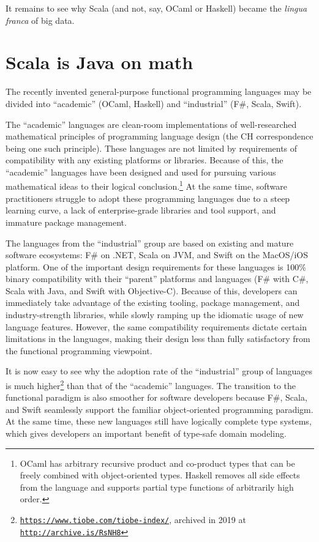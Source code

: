 It remains to see why Scala (and not, say, OCaml or Haskell) became
the \emph{lingua franca} of big data.

\section{Scala is Java on math }

The recently invented general-purpose functional programming languages
may be divided into \textsf{``}academic\textsf{''} (OCaml, Haskell) and \textsf{``}industrial\textsf{''}
(F\#, Scala, Swift).

The \textsf{``}academic\textsf{''} languages are clean-room implementations of well-researched
mathematical principles of programming language design (the CH correspondence
being one such principle). These languages are not limited by requirements
of compatibility with any existing platforms or libraries. Because
of this, the \textsf{``}academic\textsf{''} languages have been designed and used
for pursuing various mathematical ideas to their logical conclusion.\footnote{OCaml has arbitrary recursive product and co-product types that can
be freely combined with object-oriented types. Haskell removes all
side effects from the language and supports partial type functions
of arbitrarily high order.} At the same time, software practitioners struggle to adopt these
programming languages due to a steep learning curve, a lack of enterprise-grade
libraries and tool support, and immature package management.

The languages from the \textsf{``}industrial\textsf{''} group are based on existing
and mature software ecosystems: F\# on .NET, Scala on JVM, and Swift
on the MacOS/iOS platform. One of the important design requirements
for these languages is 100\% binary compatibility with their \textsf{``}parent\textsf{''}
platforms and languages (F\# with C\#, Scala with Java, and Swift
with Objective-C). Because of this, developers can immediately take
advantage of the existing tooling, package management, and industry-strength
libraries, while slowly ramping up the idiomatic usage of new language
features. However, the same compatibility requirements dictate certain
limitations in the languages, making their design less than fully
satisfactory from the functional programming viewpoint.

It is now easy to see why the adoption rate of the \textsf{``}industrial\textsf{''}
group of languages is much higher\footnote{\texttt{\href{https://www.tiobe.com/tiobe-index/}{https://www.tiobe.com/tiobe-index/}},
archived in 2019 at \texttt{\href{http://archive.is/RsNH8}{http://archive.is/RsNH8}}} than that of the \textsf{``}academic\textsf{''} languages. The transition to the
functional paradigm is also smoother for software developers because
F\#, Scala, and Swift seamlessly support the familiar object-oriented
programming paradigm. At the same
time, these new languages still have logically complete type systems,
which gives developers an important benefit of type-safe domain modeling.

